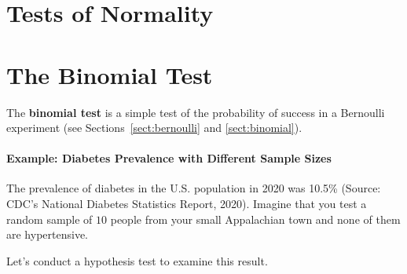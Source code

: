 
\section{Tests of Normality}


\section{The Binomial Test}

The \textbf{binomial test} is a simple test of the probability of success in a Bernoulli experiment (see Sections~\ref{sect:bernoulli} and \ref{sect:binomial}). 

\paragraph{Example: Diabetes Prevalence with Different Sample Sizes} The prevalence of diabetes in the U.S. population in 2020 was 10.5\% (Source: CDC's National Diabetes Statistics Report, 2020). Imagine that you test a random sample of $10$ people from your small Appalachian town and none of them are hypertensive.

\noindent Let's conduct a hypothesis test to examine this result.

